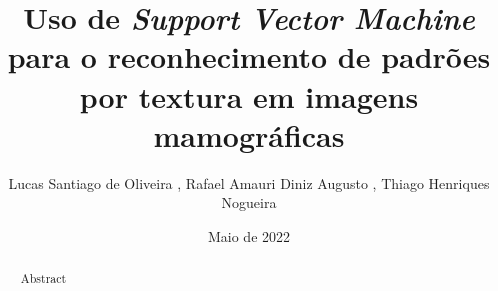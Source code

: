 \documentclass[12pt]{article}
\title{Uso de \emph{Support Vector Machine} para o reconhecimento de padrões por textura em imagens mamográficas}
\date{Maio de 2022}
\author{Lucas Santiago de Oliveira \inst{1}, Rafael Amauri Diniz Augusto \inst{1}, Thiago Henriques Nogueira \inst{1}}
\begin{document}
    \maketitle

    \begin{abstract}
        Abstract
    \end{abstract}
\end{document}
